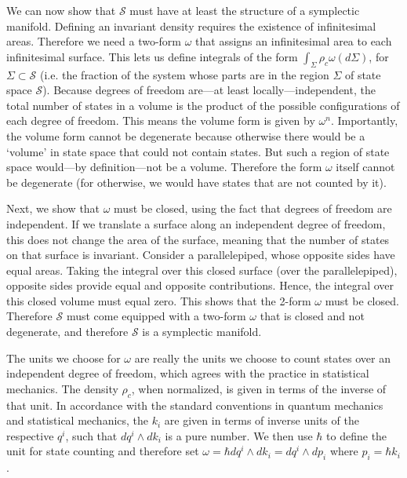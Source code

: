 \documentclass[letterpaper]{article}
\begin{document}
We can now show that $\mathcal{S}$ must have at least the structure of a symplectic manifold. Defining an invariant density requires the existence of infinitesimal areas. Therefore we need a two-form $\omega$ that assigns an infinitesimal area to each infinitesimal surface. This lets us define integrals of the form $\int_{\Sigma} \rho_c \omega(d\Sigma)$, for $\Sigma \subset \mathcal{S}$ (i.e. the fraction of the system whose parts are in the region $\Sigma$ of state space $\mathcal{S}$). Because degrees of freedom are---at least locally---independent, the total number of states in a volume is the product of the possible configurations of each degree of freedom. This means the volume form is given by $\omega^n$. Importantly, the volume form cannot be degenerate because otherwise there would be a `volume' in state space that could not contain states. But such a region of state space would---by definition---not be a volume. Therefore the form $\omega$ itself cannot be degenerate (for otherwise, we would have states that are not counted by it). 

Next, we show that $\omega$ must be closed, using the fact that degrees of freedom are independent. If we translate a surface along an independent degree of freedom, this does not change the area of the surface, meaning that the number of states on that surface is invariant. Consider a parallelepiped, whose opposite sides have equal areas. Taking the integral over this closed surface (over the parallelepiped), opposite sides provide equal and opposite contributions. Hence, the integral over this closed volume must equal zero. This shows that the 2-form $\omega$ must be closed. Therefore $\mathcal{S}$ must come equipped with a two-form $\omega$ that is closed and not degenerate, and therefore $\mathcal{S}$ is a symplectic manifold.

The units we choose for $\omega$ are really the units we choose to count states over an independent degree of freedom, which agrees with the practice in statistical mechanics. The density $\rho_c$, when normalized, is given in terms of the inverse of that unit. In accordance with the standard conventions in quantum mechanics and statistical mechanics, the $k_i$ are given in terms of inverse units of the respective $q^i$, such that $dq^i \wedge dk_i$ is a pure number. We then use $\hbar$ to define the unit for state counting and therefore set $\omega = \hbar dq^i \wedge dk_i = dq^i \wedge dp_i$ where $p_i = \hbar k_i$.
\end{document}
